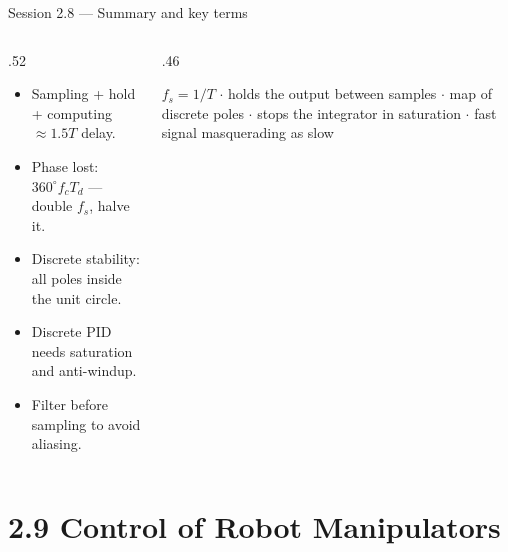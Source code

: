 \documentclass[aspectratio=169,10pt]{beamer}
\begin{document}
\begin{frame}{Session 2.8 --- Summary and key terms}
\begin{columns}[T]
\begin{column}{.52\textwidth}
\begin{keybox}
\begin{itemize}\setlength\itemsep{.4mm}
\item Sampling + hold + computing $\approx1.5T$ delay.
\item Phase lost: $360^\circ f_cT_d$ --- double $f_s$, halve it.
\item Discrete stability: all poles inside the unit circle.
\item Discrete PID needs saturation and anti-windup.
\item Filter before sampling to avoid aliasing.
\end{itemize}
\end{keybox}
\end{column}
\begin{column}{.46\textwidth}
\begin{defbox}
\small
{} $f_s=1/T$ $\cdot$  holds the output between samples $\cdot$  map of discrete poles $\cdot$  stops the integrator in saturation $\cdot$  fast signal masquerading as slow
\end{defbox}
\end{column}
\end{columns}
\end{frame}

\section{2.9 Control of Robot Manipulators}
\end{document}
